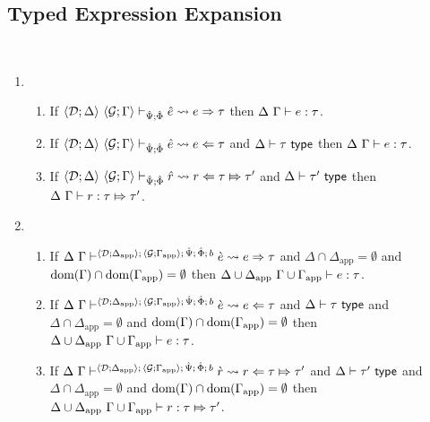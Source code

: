 \subsection{Typed Expression Expansion}\label{appendix:SES-typed-expression-expansion}
\begin{theorem}\label{thm:typed-expansion-full-U} ~
\begin{enumerate}
  \item \begin{enumerate}
    \item If $\langle \mathcal{D}; \Delta \rangle~\langle \mathcal{G}; \Gamma \rangle \vdash_{\hat{\Psi}; \hat\Phi} {\hat e} \leadsto e \Rightarrow \tau$ then $\Delta~\Gamma \vdash e : \tau$.
    \item If $\langle \mathcal{D}; \Delta \rangle~\langle \mathcal{G}; \Gamma \rangle \vdash_{\hat{\Psi}; \hat\Phi} {\hat e} \leadsto e \Leftarrow \tau$ and $\Delta \vdash \tau~\mathsf{type}$ then $\Delta~\Gamma \vdash e : \tau$.
    \item If $\langle \mathcal{D}; \Delta \rangle~\langle \mathcal{G}; \Gamma \rangle \vdash_{\hat{\Psi}; \hat\Phi} \hat{r} \leadsto r \Leftarrow \tau \Mapsto \tau'$ and $\Delta \vdash \tau'~\mathsf{type}$ then $\Delta~\Gamma \vdash r : \tau \Mapsto \tau'$.
  \end{enumerate}
  \item \begin{enumerate}
    \item If $\Delta~\Gamma \vdash^{\langle \mathcal{D}; \Delta_\text{app} \rangle;\,\langle \mathcal{G}; \Gamma_\text{app} \rangle;\,\hat{\Psi};\,\hat\Phi;\,b} \grave{e} \leadsto e \Rightarrow \tau$ and $\Delta \cap \Delta_\text{app}=\emptyset$ and $\text{dom}(\Gamma) \cap \text{dom}(\Gamma_\text{app})=\emptyset$ then ${\Delta}\cup{\Delta_\text{app}}~{\Gamma}\cup{\Gamma_\text{app}} \vdash e : \tau$. 
    \item If $\Delta~\Gamma \vdash^{\langle \mathcal{D}; \Delta_\text{app} \rangle;\,\langle \mathcal{G}; \Gamma_\text{app} \rangle;\,\hat{\Psi};\,\hat\Phi;\,b} \grave{e} \leadsto e \Leftarrow \tau$ and $\Delta \vdash \tau~\mathsf{type}$ and $\Delta \cap \Delta_\text{app}=\emptyset$ and $\text{dom}(\Gamma) \cap \text{dom}(\Gamma_\text{app})=\emptyset$ then ${\Delta}\cup{\Delta_\text{app}}~{\Gamma}\cup{\Gamma_\text{app}} \vdash e : \tau$. 
    \item If $\Delta~\Gamma \vdash^{\langle \mathcal{D}; \Delta_\text{app} \rangle;\,\langle \mathcal{G}; \Gamma_\text{app} \rangle;\,\hat{\Psi};\,\hat\Phi;\,b} \grave{r} \leadsto r \Leftarrow \tau \Mapsto \tau'$ and $\Delta \vdash \tau'~\mathsf{type}$ and $\Delta \cap \Delta_\text{app}=\emptyset$ and $\text{dom}(\Gamma) \cap \text{dom}(\Gamma_\text{app})=\emptyset$ then ${\Delta}\cup{\Delta_\text{app}}~{\Gamma}\cup{\Gamma_\text{app}} \vdash r : \tau \Mapsto \tau'$.
  \end{enumerate}
\end{enumerate}
\end{theorem}
